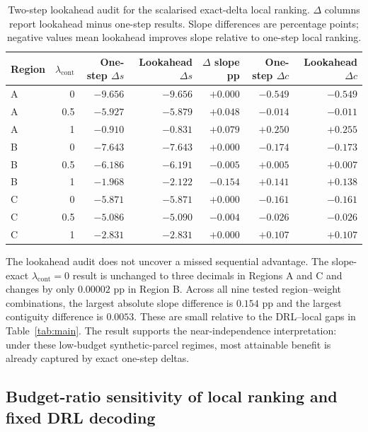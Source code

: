 \documentclass[]{interact}
\theoremstyle{plain}
\begin{document}
\begin{table}[htbp]
\centering
\caption{Two-step lookahead audit for the scalarised exact-delta local ranking. $\Delta$ columns report lookahead minus one-step results. Slope differences are percentage points; negative values mean lookahead improves slope relative to one-step local ranking.}
\label{tab:lookahead}
\scriptsize
\begin{tabular}{lrrrrrr}
\toprule
Region & $\lambda_{\mathrm{cont}}$ & One-step $\Delta s$ & Lookahead $\Delta s$ & $\Delta$ slope pp & One-step $\Delta c$ & Lookahead $\Delta c$ \\
\midrule
A & 0   & $-9.656$ & $-9.656$ & $+0.000$ & $-0.549$ & $-0.549$ \\
A & 0.5 & $-5.927$ & $-5.879$ & $+0.048$ & $-0.014$ & $-0.011$ \\
A & 1   & $-0.910$ & $-0.831$ & $+0.079$ & $+0.250$ & $+0.255$ \\
\midrule
B & 0   & $-7.643$ & $-7.643$ & $+0.000$ & $-0.174$ & $-0.173$ \\
B & 0.5 & $-6.186$ & $-6.191$ & $-0.005$ & $+0.005$ & $+0.007$ \\
B & 1   & $-1.968$ & $-2.122$ & $-0.154$ & $+0.141$ & $+0.138$ \\
\midrule
C & 0   & $-5.871$ & $-5.871$ & $+0.000$ & $-0.161$ & $-0.161$ \\
C & 0.5 & $-5.086$ & $-5.090$ & $-0.004$ & $-0.026$ & $-0.026$ \\
C & 1   & $-2.831$ & $-2.831$ & $+0.000$ & $+0.107$ & $+0.107$ \\
\bottomrule
\end{tabular}
\end{table}

The lookahead audit does not uncover a missed sequential advantage. The slope-exact $\lambda_{\mathrm{cont}}=0$ result is unchanged to three decimals in Regions A and C and changes by only $0.00002$ pp in Region B. Across all nine tested region--weight combinations, the largest absolute slope difference is $0.154$ pp and the largest contiguity difference is $0.0053$. These are small relative to the DRL--local gaps in Table~\ref{tab:main}. The result supports the near-independence interpretation: under these low-budget synthetic-parcel regimes, most attainable benefit is already captured by exact one-step deltas.

\subsection{Budget-ratio sensitivity of local ranking and fixed DRL decoding}\label{sec:results-budget}
\end{document}

